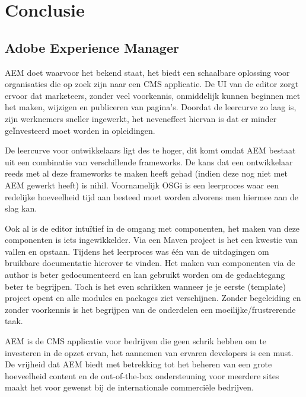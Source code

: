 \documentclass{article}
\begin{document}
	\section{Conclusie}
    \subsection{Adobe Experience Manager}
    AEM doet waarvoor het bekend staat, het biedt een schaalbare oplossing voor organisaties die op zoek zijn naar een CMS applicatie. 
    De UI van de editor zorgt ervoor dat marketeers, zonder veel voorkennis, onmiddelijk kunnen beginnen met het maken, wijzigen en publiceren van pagina's. 
    Doordat de leercurve zo laag is, zijn werknemers sneller ingewerkt, het neveneffect hiervan is dat er minder ge\"Investeerd moet worden in opleidingen.
    \par
    De leercurve voor ontwikkelaars ligt des te hoger, dit komt omdat AEM bestaat uit een combinatie van verschillende frameworks. 
    De kans dat een ontwikkelaar reeds met al deze frameworks te maken heeft gehad (indien deze nog niet met AEM gewerkt heeft) is nihil.
    Voornamelijk OSGi is een leerproces waar een redelijke hoeveelheid tijd aan besteed moet worden alvorens men hiermee aan de slag kan.
    \par
    Ook al is de editor intu\"itief in de omgang met componenten, het maken van deze componenten is iets ingewikkelder. Via een Maven project
    is het een kwestie van vallen en opstaan. Tijdens het leerproces was \'e\'en van de uitdagingen om bruikbare documentatie hierover te vinden. 
    Het maken van componenten via de author is beter gedocumenteerd en kan gebruikt worden om de gedachtegang beter te begrijpen. 
    Toch is het even schrikken wanneer je je eerste (template) project opent en alle modules en packages ziet verschijnen.
    Zonder begeleiding en zonder voorkennis is het begrijpen van de onderdelen een moeilijke/frustrerende taak.
    \par
    AEM is de CMS applicatie voor bedrijven die geen schrik hebben om te investeren in de opzet ervan, het aannemen van ervaren developers is een must.
    De vrijheid dat AEM biedt met betrekking tot het beheren van een grote hoeveelheid content en de out-of-the-box ondersteuning voor meerdere sites maakt
    het voor gewenst bij de internationale commerci\"ele bedrijven. 
\end{document}
